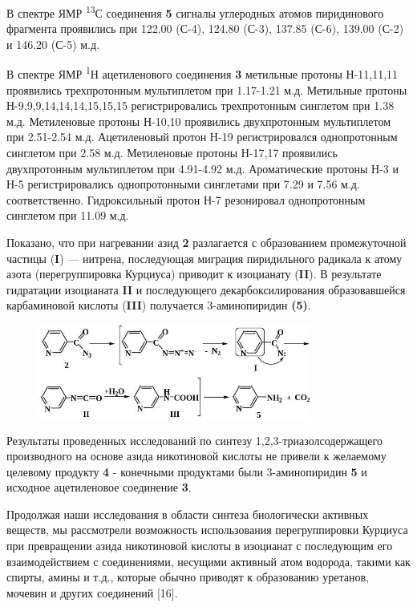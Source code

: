 В спектре ЯМР \textsuperscript{13}С соединения {\bfseries 5} сигналы
углеродных атомов пиридинового фрагмента проявились при 122.00 (С-4),
124.80 (С-3), 137.85 (С-6), 139.00 (С-2) и 146.20 (С-5) м.д.

В спектре ЯМР \textsuperscript{1}Н ацетиленового соединения {\bfseries 3}
метильные протоны Н-11,11,11 проявились трехпротонным мультиплетом при
1.17-1.21 м.д. Метильные протоны Н-9,9,9,14,14,14,15,15,15
регистрировались трехпротонным синглетом при 1.38 м.д. Метиленовые
протоны Н-10,10 проявились двухпротонным мультиплетом при 2.51-2.54 м.д.
Ацетиленовый протон Н-19 регистрировался однопротонным синглетом при
2.58 м.д. Метиленовые протоны Н-17,17 проявились двухпротонным
мультиплетом при 4.91-4.92 м.д. Ароматические протоны Н-3 и Н-5
регистрировались однопротонными синглетами при 7.29 и 7.56 м.д.
соответственно. Гидроксильный протон Н-7 резонировал однопротонным
синглетом при 11.09 м.д.

Показано, что при нагревании азид {\bfseries 2} разлагается с образованием
промежуточной частицы ({\bfseries I}) --- нитрена, последующая миграция
пиридильного радикала к атому азота (перегруппировка Курциуса) приводит
к изоцианату ({\bfseries II}). В результате гидратации изоцианата
{\bfseries II} и последующего декарбоксилирования образовавшейся
карбаминовой кислоты ({\bfseries III}) получается 3-аминопиридин
{\bfseries (5)}.

\begin{figure}[H]
	\centering
	\includegraphics[width=0.8\textwidth]{assets/4}
	\caption*{}
\end{figure}

Результаты проведенных исследований по синтезу 1,2,3-триазолсодержащего
производного на основе азида никотиновой кислоты не привели к желаемому
целевому продукту {\bfseries 4} - конечными продуктами были 3-аминопиридин
{\bfseries 5} и исходное ацетиленовое соединение {\bfseries 3}.

Продолжая наши исследования в области синтеза биологически активных
веществ, мы рассмотрели возможность использования перегруппировки
Курциуса при превращении азида никотиновой кислоты в изоцианат с
последующим его взаимодействием с соединениями, несущими активный атом
водорода, такими как спирты, амины и т.д., которые обычно приводят к
образованию уретанов, мочевин и других соединений {[}16{]}.

